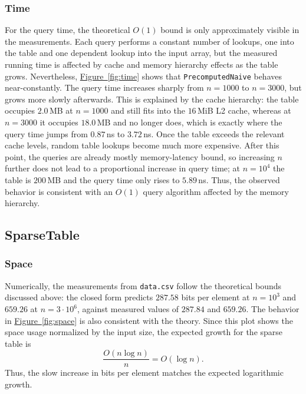 \documentclass[a4paper,UKenglish,cleveref,thm-restate]{lipics-v2021}
\begin{document}
\subsubsection{Time}
For the query time, the theoretical $O(1)$ bound is only approximately visible
in the measurements. Each query performs a constant number of lookups, one into
the table and one dependent lookup into the input array, but
the measured running time is affected by cache and memory hierarchy effects as
the table grows. Nevertheless, \hyperref[fig:time]{Figure~\ref*{fig:time}}
shows that \texttt{PrecomputedNaive} behaves near-constantly.
The query time increases sharply from $n=1000$ to $n=3000$,
but grows more slowly afterwards. This is explained by the cache hierarchy: the
table occupies $2.0$\,MB at $n=1000$ and still fits into the $16$\,MiB L2 cache,
whereas at $n=3000$ it occupies $18.0$\,MB and no longer does, which is exactly
where the query time jumps from $0.87$\,ns to $3.72$\,ns.
Once the table exceeds the relevant cache levels, random table lookups
become much more expensive. After this point, the queries are already mostly
memory-latency bound, so increasing $n$ further does not lead to a
proportional increase in query time; at $n=10^4$ the table is $200$\,MB and the
query time only rises to $5.89$\,ns. Thus, the observed behavior is consistent
with an $O(1)$ query algorithm affected by the memory hierarchy.


\subsection{SparseTable}
\subsubsection{Space}
Numerically, the measurements from \texttt{data.csv} follow the theoretical bounds discussed above:
the closed form predicts $287.58$ bits per element at $n=10^3$ and $659.26$ at $n=3\cdot10^6$, against measured values of $287.84$ and $659.26$.
The behavior in \hyperref[fig:space]{Figure~\ref*{fig:space}} is also consistent with the theory.
Since this plot shows the space usage normalized by the input size, the expected growth for the sparse table is
\[
	\frac{O(n \log n)}{n} = O(\log n).
\]
Thus, the slow increase in bits per element matches the expected logarithmic growth.
\end{document}
